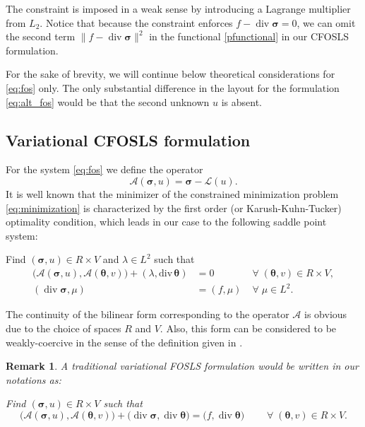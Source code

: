 \documentclass[a4paper,12pt]{amsart}
\numberwithin{equation}{section}
\newtheorem{remark}{Remark}[section]
\renewcommand{\div}{\operatorname{div}}
\newcommand{\A}{{\mathcal A}}
\renewcommand{\L}{{\mathcal L}}
\def\btheta{{\boldsymbol \theta}}
\def\bsigma{{\boldsymbol \sigma}}
\newcommand{\om}{\Omega}
\begin{document}
The constraint is imposed in a weak sense by introducing a Lagrange multiplier from $L_2$. Notice that because the constraint enforces $f-\div \bsigma = 0$, we can omit the second term $\| f-\div \bsigma \| ^2$ in the functional \eqref{pfunctional} in our CFOSLS formulation.

For the sake of brevity, we will continue below theoretical considerations for \eqref{eq:fos} only. The only substantial difference in the layout for the formulation \eqref{eq:alt_fos} would be that the second unknown $u$ is absent.

\subsection{Variational CFOSLS formulation} 
For the system \eqref{eq:fos} we define the operator
\[ 
\A(\bsigma, u ) = \bsigma -\L(u).
\]
It is well known that the minimizer of the constrained minimization problem \eqref{eq:minimization} is characterized by the first order (or Karush-Kuhn-Tucker) optimality condition, which leads in our case to the following saddle point system: 

Find $(\bsigma, u) \in R\times V$ and $\lambda \in L^2$ such that 
\begin{equation}
\begin{array}{lll}
\big(\A(\bsigma, u), \A(\btheta, v) \big) + (\lambda, \mathrm{div}\,  \btheta) & = 0  & \;\forall\; (\btheta, v) \in R\times V,     \\
( \div  \bsigma,\mu )  &= (f, \mu) &  \;\forall\;  \mu\in L^2.
\end{array}
\label{eq:kkt_system}
\end{equation} 

The continuity of the bilinear form corresponding to the operator $\A$ is obvious due to the choice of spaces $R$ and $V$. Also, this form can be considered to be weakly-coercive in the sense of the definition given in \cite{AdlerVassilevski}.

\begin{remark}
A traditional variational FOSLS formulation would be written in our notations as:

Find $(\bsigma, u) \in R\times V$ such that 
\[
\big(\A(\bsigma, u ), \A(\btheta, v) \big) + \big( \div \bsigma, \div \btheta \big) = \big(f, \div \btheta\big) \qquad \;\forall\; (\btheta, v) \in R\times V.
\]
\end{remark}
\end{document}
